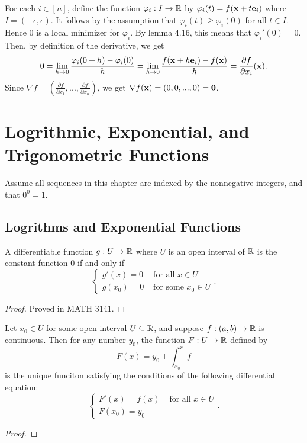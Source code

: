 \documentclass[letterpaper, twoside, 12pt]{book}
\begin{document}
\begin{solution}
    For each \(i \in [n]\), define the function \(\varphi_i: I \to \mathbb R\) 
    by \(\varphi_i(t) = f(\mathbf x + t \mathbf e_i)\) where \(I = (-\epsilon, \epsilon)\).
    It follows by the assumption that \(\varphi_i(t) \geq \varphi_i(0)\) 
    for all \(t \in I\). Hence \(0\) is a local minimizer for \(\varphi_i\).
    By lemma 4.16, this means that \(\varphi_i'(0) = 0\). Then, by definition
    of the derivative, we get
    \[ 0 = \lim_{h \to 0} \frac{ \varphi_i(0 + h) - \varphi_i(0)}{h} =
        \lim_{h \to 0} \frac{ f(\mathbf x + h \mathbf e_i) - f(\mathbf x)}{h} = 
    \frac{\partial f}{\partial x_i}(\mathbf x) .\]
    Since \(\nabla f = (\frac{\partial f}{\partial x_1},...,\frac{\partial f}{\partial x_n})\),
    we get \(\nabla f(\mathbf x) = (0,0,...,0) = \mathbf 0 \).

\end{solution}


\setcounter{chapter}{-1}
\chapter[Log, Exp, and Trig Functions]{Logrithmic, Exponential, and Trigonometric Functions}

Assume all sequences in this chapter are indexed by the nonnegative integers,
and that \(0^0=1\).

\section{Logrithms and Exponential Functions}

\begin{theorem}
  A differentiable function \(g:U\to\mathbb R\) where \(U\) is an open interval
  of \(\mathbb R\) is the constant function \(0\) if and only if
  \[
    \begin{cases}
      g'(x)=0 & \text{ for all } x\in U \\
      g(x_0)=0 & \text{ for some } x_0\in U
    \end{cases}
  .\]
\end{theorem}
\begin{proof}
  Proved in MATH 3141.
\end{proof}

\begin{proposition}[7.1]
  Let \(x_0\in U\) for some open interval \(U\subseteq\mathbb R\),
  and suppose \(f:(a,b)\to\mathbb R\) is continuous.
  Then for any number \(y_0\), the function \(F:U\to\mathbb R\) defined by
  \[
    F(x) = y_0 + \int_{x_0}^x f
  \]
  is the unique funciton satisfying
  the conditions of the following differential equation:
  \[
    \begin{cases}
      F'(x)=f(x) & \text{ for all } x\in U \\
      F(x_0)=y_0
    \end{cases}
  .\]
\end{proposition}
\begin{proof}

\end{proof}
\end{document}
